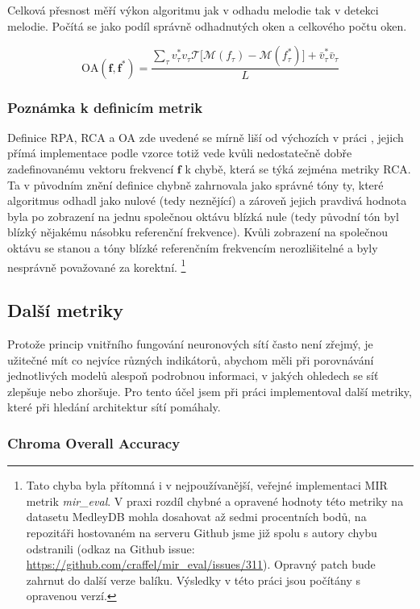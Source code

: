 Celková přesnost měří výkon algoritmu jak v odhadu melodie tak v detekci melodie. Počítá se jako podíl správně odhadnutých oken a celkového počtu oken.

    $$\mathrm{OA}(\mathbf{f}, \mathbf{f^*}) = \frac{\sum_\tau{v^*_\tau v_\tau \mathcal{T}[\mathcal{M}(f_\tau) - \mathcal{M}(f^*_\tau)}] + \bar{v}^*_\tau \bar{v}_\tau }{L}$$

\subsubsection{Poznámka k definicím metrik}

Definice RPA, RCA a OA zde uvedené se mírně liší od výchozích v práci \cite{Salamon2014}, jejich přímá implementace podle vzorce totiž vede kvůli nedostatečně dobře zadefinovanému vektoru frekvencí $\mathbf{f}$ k chybě, která se týká zejména metriky RCA. Ta v původním znění definice chybně zahrnovala jako správné tóny ty, které algoritmus odhadl jako nulové (tedy neznějící) a zároveň jejich pravdivá hodnota byla po zobrazení na jednu společnou oktávu blízká nule (tedy původní tón byl blízký nějakému násobku referenční frekvence). Kvůli zobrazení na společnou oktávu se stanou  a tóny blízké referenčním frekvencím nerozlišitelné a byly nesprávně považované za korektní. \footnote{
    Tato chyba byla přítomná i v nejpoužívanější, veřejné implementaci MIR metrik \textit{mir\_eval}. V praxi rozdíl chybné a opravené hodnoty této metriky na datasetu MedleyDB mohla dosahovat až sedmi procentních bodů, na repozitáři hostovaném na serveru Github jsme již spolu s autory chybu odstranili (odkaz na Github issue: \url{https://github.com/craffel/mir_eval/issues/311}). Opravný patch bude zahrnut do další verze balíku. Výsledky v této práci jsou počítány s opravenou verzí.}

\subsection{Další metriky}

Protože princip vnitřního fungování neuronových sítí často není zřejmý, je užitečné mít co nejvíce různých indikátorů, abychom měli při porovnávání jednotlivých modelů alespoň podrobnou informaci, v jakých ohledech se síť zlepšuje nebo zhoršuje. Pro tento účel jsem při práci implementoval další metriky, které při hledání architektur sítí pomáhaly.

\subsubsection{Chroma Overall Accuracy}

